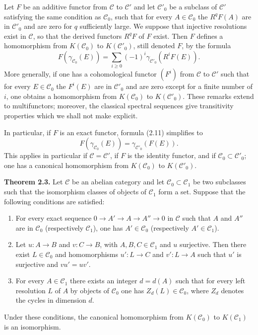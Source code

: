 \documentclass[11pt]{article}
\providecommand{\cC}{\mathcal C}
\begin{document}
Let $F$ be an additive functor from $\cC$ to $\cC'$ and let $\cC'_0$ be a subclass of $\cC'$ satisfying the same condition as $\cC_0$, such that for every $A\in\cC_0$ the $R^qF(A)$ are in $\cC'_0$ and are zero for $q$ sufficiently large. We suppose that injective resolutions exist in $\cC$, so that the derived functors $R^qF$ of $F$ exist. Then $F$ defines a homomorphism from $K(\cC_0)$ to $K(\cC'_0)$, still denoted $F$, by the formula
\begin{equation}\tag{2.11}
 F(\gamma_{\cC_0}(E))=\sum_{i\geq 0}(-1)^i\gamma_{\cC'_0}(R^iF(E)).
\end{equation}
More generally, if one has a cohomological functor $(F^i)$ from $\cC$ to $\cC'$ such that for every $E\in\cC_0$ the $F^i(E)$ are in $\cC'_0$ and are zero except for a finite number of $i$, one obtains a homomorphism from $K(\cC_0)$ to $K(\cC'_0)$. These remarks extend to multifunctors; moreover, the classical spectral sequences give transitivity properties which we shall not make explicit.

In particular, if $F$ is an exact functor, formula (2.11) simplifies to
\begin{equation}\tag{2.11 bis}
 F(\gamma_{\cC_0}(E))=\gamma_{\cC'_0}(F(E)).
\end{equation}
This applies in particular if $\cC=\cC'$, if $F$ is the identity functor, and if $\cC_0\subset \cC'_0$; one has a canonical homomorphism from $K(\cC_0)$ to $K(\cC'_0)$.

\textbf{Theorem 2.3.} Let $\cC$ be an abelian category and let $\cC_0\subset \cC_1$ be two subclasses such that the isomorphism classes of objects of $\cC_1$ form a set. Suppose that the following conditions are satisfied:

\begin{enumerate}[label=(\roman*)]
\item For every exact sequence $0\to A'\to A\to A''\to 0$ in $\cC$ such that $A$ and $A''$ are in $\cC_0$ (respectively $\cC_1$), one has $A'\in\cC_0$ (respectively $A'\in\cC_1$).
\item Let $u:A\to B$ and $v:C\to B$, with $A,B,C\in\cC_1$ and $u$ surjective. Then there exist $L\in\cC_0$ and homomorphisms $u':L\to C$ and $v':L\to A$ such that $u'$ is surjective and $vu'=uv'$.
\item For every $A\in\cC_1$ there exists an integer $d=d(A)$ such that for every left resolution $L$ of $A$ by objects of $\cC_0$ one has $Z_d(L)\in\cC_0$, where $Z_d$ denotes the cycles in dimension $d$.
\end{enumerate}
Under these conditions, the canonical homomorphism from $K(\cC_0)$ to $K(\cC_1)$ is an isomorphism.
\end{document}
